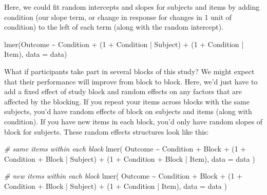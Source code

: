 \documentclass[
]{book}
\newenvironment{Shaded}{\begin{snugshade}}{\end{snugshade}}
\newcommand{\AttributeTok}[1]{\textcolor[rgb]{0.77,0.63,0.00}{#1}}
\newcommand{\CommentTok}[1]{\textcolor[rgb]{0.56,0.35,0.01}{\textit{#1}}}
\newcommand{\DecValTok}[1]{\textcolor[rgb]{0.00,0.00,0.81}{#1}}
\newcommand{\FunctionTok}[1]{\textcolor[rgb]{0.00,0.00,0.00}{#1}}
\newcommand{\NormalTok}[1]{#1}
\newcommand{\SpecialCharTok}[1]{\textcolor[rgb]{0.00,0.00,0.00}{#1}}
\begin{document}
Here, we could fit random intercepts and slopes for subjects and items by adding condition (our slope term, or change in response for changes in 1 unit of condition) to the left of each term (along with the random intercept).

\begin{Shaded}
\begin{Highlighting}[]
\FunctionTok{lmer}\NormalTok{(Outcome }\SpecialCharTok{\textasciitilde{}}\NormalTok{ Condition }\SpecialCharTok{+}\NormalTok{ (}\DecValTok{1} \SpecialCharTok{+}\NormalTok{ Condition }\SpecialCharTok{|}\NormalTok{ Subject) }\SpecialCharTok{+}\NormalTok{ (}\DecValTok{1} \SpecialCharTok{+}\NormalTok{ Condition }\SpecialCharTok{|}\NormalTok{ Item), }\AttributeTok{data =}\NormalTok{ data)}
\end{Highlighting}
\end{Shaded}

What if participants take part in several blocks of this study? We might expect that their performance will improve from block to block. Here, we'd just have to add a fixed effect of study block and random effects on any factors that are affected by the blocking. If you repeat your items across blocks with the same subjects, you'd have random effects of block on subjects and items (along with condition). If you have new items in each block, you'd only have random slopes of block for subjects. These random effects structures look like this:

\begin{Shaded}
\begin{Highlighting}[]
\CommentTok{\# same items within each block}
\FunctionTok{lmer}\NormalTok{(}
\NormalTok{  Outcome }\SpecialCharTok{\textasciitilde{}}\NormalTok{ Condition }\SpecialCharTok{+}\NormalTok{ Block }\SpecialCharTok{+} 
\NormalTok{    (}\DecValTok{1} \SpecialCharTok{+}\NormalTok{ Condition }\SpecialCharTok{+}\NormalTok{ Block }\SpecialCharTok{|}\NormalTok{ Subject) }\SpecialCharTok{+} 
\NormalTok{    (}\DecValTok{1} \SpecialCharTok{+}\NormalTok{ Condition }\SpecialCharTok{+}\NormalTok{ Block }\SpecialCharTok{|}\NormalTok{ Item), }
  \AttributeTok{data =}\NormalTok{ data}
\NormalTok{  )}

\CommentTok{\# new items within each block}
\FunctionTok{lmer}\NormalTok{(}
\NormalTok{  Outcome }\SpecialCharTok{\textasciitilde{}}\NormalTok{ Condition }\SpecialCharTok{+}\NormalTok{ Block }\SpecialCharTok{+} 
\NormalTok{    (}\DecValTok{1} \SpecialCharTok{+}\NormalTok{ Condition }\SpecialCharTok{+}\NormalTok{ Block }\SpecialCharTok{|}\NormalTok{ Subject) }\SpecialCharTok{+} 
\NormalTok{    (}\DecValTok{1} \SpecialCharTok{+}\NormalTok{ Condition }\SpecialCharTok{|}\NormalTok{ Item), }
  \AttributeTok{data =}\NormalTok{ data}
\NormalTok{  )}
\end{Highlighting}
\end{Shaded}
\end{document}
